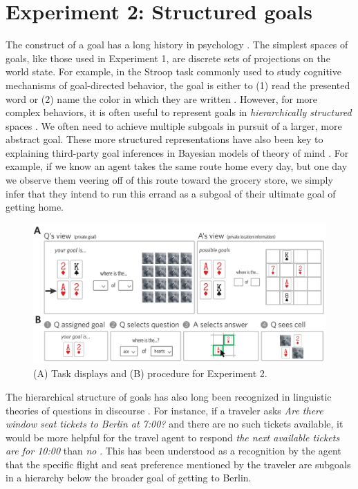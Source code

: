 \documentclass[11pt, floatsintext]{apa6}
\begin{document}
\section{Experiment 2: Structured goals}

The construct of a goal has a long history in psychology \cite{miller1960plans, Schank:1977hh, austin1996goal}.
The simplest spaces of goals, like those used in Experiment 1, are discrete sets of projections on the world state.
For example, in the Stroop task commonly used to study cognitive mechanisms of goal-directed behavior, the goal is either to (1) read the presented word or (2) name the color in which they are written \cite{miller2001integrative}.
However, for more complex behaviors, it is often useful to represent goals in \emph{hierarchically structured} spaces \cite{badre2008cognitive,botvinick2008hierarchical}. 
We often need to achieve multiple subgoals in pursuit of a larger, more abstract goal. 
These more structured representations have also been key to explaining third-party goal inferences in Bayesian models of theory of mind \cite{BakerSaxeTenenbaum09_ActionUnderstandingInversePlanning}. 
For example, if we know an agent takes the same route home every day, but one day we observe them veering off of this route toward the grocery store, we simply infer that they intend to run this errand as a subgoal of their ultimate goal of getting home. 

\begin{figure}[th!]
\begin{center}
\includegraphics[scale = .9]{Exp2/task.pdf}
\end{center}
\caption{(A) Task displays and (B) procedure for Experiment 2.}
\label{fig:exp2task}
\end{figure}

The hierarchical structure of goals has also long been recognized in linguistic theories of questions in discourse  \cite{Kuppevelt95_TopicalityDiscourse,Roberts96_InformationStructureDiscourse,Buring03_DtreesBeansBaccents,Groenendijk99_LogicOfInterrogation,rojas2014discourse}.
For instance, if a traveler asks \emph{Are there window seat tickets to Berlin at 7:00?} and there are no such tickets available, it would be more helpful for the travel agent to respond \emph{the next available tickets are for 10:00} than \emph{no} \cite{rojas2013roadsigns}.
This has been understood as a recognition by the agent that the specific flight and seat preference mentioned by the traveler are subgoals in a hierarchy below the broader goal of getting to Berlin. 
\end{document}
